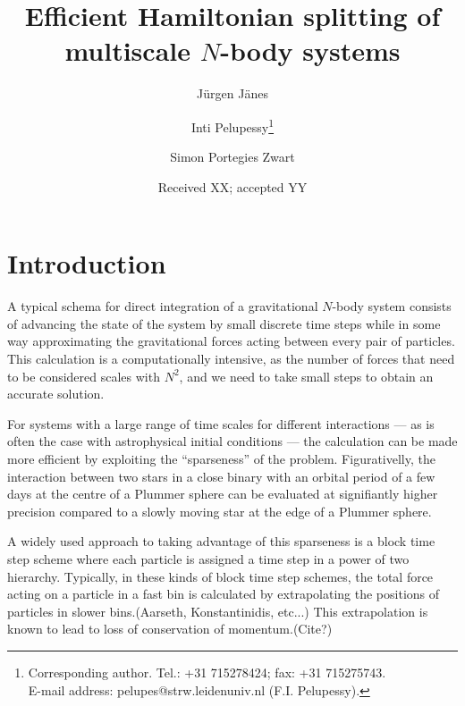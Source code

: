 \documentclass[referee]{aa}
\begin{document}
\title{Efficient Hamiltonian splitting of multiscale $N$-body systems}

\author{
J\"urgen J\"anes\and
Inti Pelupessy\thanks{
Corresponding author. Tel.: +31 715278424; fax: +31 715275743.\\
E-mail address: pelupes@strw.leidenuniv.nl (F.I. Pelupessy).}\and
Simon Portegies Zwart
}


\date{Received XX; accepted YY}


\maketitle

\section{Introduction}
A typical schema for direct integration of a gravitational $N$-body
system consists of advancing the state of the system by small discrete
time steps while in some way approximating the gravitational forces
acting between every pair of particles. This calculation is a computationally
intensive, as the number of forces that need to be considered scales
with $N^{2}$, and we need to take small steps to obtain an accurate
solution.

For systems with a large range of time scales for different interactions
--- as is often the case with astrophysical initial conditions ---
the calculation can be made more efficient by exploiting the ``sparseness''
of the problem. Figurativelly, the interaction between two stars in
a close binary with an orbital period of a few days at the centre
of a Plummer sphere can be evaluated at signifiantly higher precision
compared to a slowly moving star at the edge of a Plummer sphere.

A widely used approach to taking advantage of this sparseness is a block time step scheme where each particle is assigned a time step in a power of two hierarchy. Typically, in these kinds of block time step schemes, the total force acting on a particle in a fast bin is calculated by extrapolating the positions of particles in slower bins.(Aarseth, Konstantinidis, etc...) This extrapolation is known to lead to loss of conservation of momentum.(Cite?)
\end{document}
